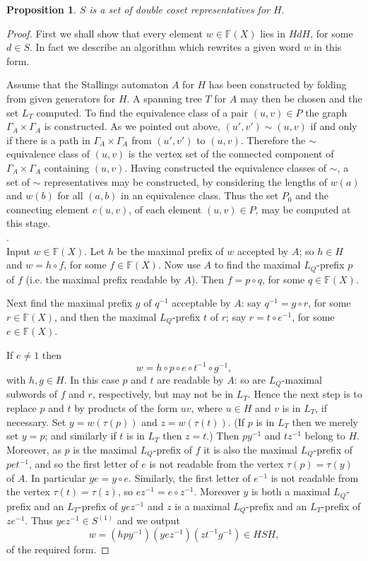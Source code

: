 \documentclass[a4paper,12pt]{article}
\newcommand{\G}{\Gamma }
\renewcommand{\t}{\tau }
\newtheorem{proposition}[theorem]{Proposition}
\numberwithin{equation}{section}
\numberwithin{figure}{section}
\newcommand{\FF}{\ensuremath{\mathbb{F}}}
\begin{document}
\begin{proposition}\label{prop:dcreps}
$S$ is a set of double coset representatives for $H$.
\end{proposition}
\begin{proof}
First we shall show that every element $w\in \FF(X)$ lies in $HdH$,
for some $d\in S$. In fact we describe an algorithm which
rewrites a given word $w$ in this form.

Assume that the Stallings automaton $A$ for $H$ has been constructed by folding from
given generators for $H$. A spanning tree $T$
for $A$ may then be chosen and the
set $L_T$ computed.
To find the equivalence class of a pair $(u,v)\in P$ the
graph $\G_A\times \G_A$ is constructed. As we pointed out above, $(u',v')\sim
(u,v)$ if and only if there is a path in $\G_A\times \G_A$ from $(u',v')$
to $(u,v)$. Therefore the $\sim$ equivalence class of $(u,v)$ is the
vertex set of the connected component of $\G_A\times \G_A$ containing
$(u,v)$.
Having constructed the equivalence classes of $\sim$,
 a set of $\sim$ representatives may be constructed, by considering the
lengths of $w(a)$ and $w(b)$ for all $(a,b)$ in an equivalence class. Thus the
set $P_0$ and the connecting element $c(u,v)$, of each element
$(u,v)\in P$, may be computed at this stage.   \\

.\\
Input $w\in \FF(X)$.
Let $h$ be the maximal prefix of $w$ accepted by $A$; so $h\in H$ and
$w=h\circ f$, for some $f\in \FF(X)$. Now use $A$ to find the maximal
$L_Q$-prefix $p$
of $f$ (i.e. the maximal prefix readable by $A$). Then
  $f= p\circ q$, for some $q\in \FF(X)$.

Next find the maximal prefix $g$ of $q^{-1}$ acceptable by $A$: say
$q^{-1}=g\circ r$, for some $r\in \FF(X)$, and then the maximal $L_Q$-prefix
$t$ of $r$; say $r=t\circ e^{-1}$, for some $e\in \FF(X)$.

If $e\neq 1$ then
\[w=h\circ p \circ e\circ t^{-1}\circ g^{-1},\]
with $h,g\in H$. In this case $p$ and $t$ are readable by $A$:
so are $L_Q$-maximal subwords of $f$ and $r$, respectively, but
may not be in $L_T$. Hence the next step is to replace $p$ and $t$ by
products of the form $uv$, where $u\in H$ and  $v$ is in $L_T$,
 if necessary.
Set $y=w(\t(p))$ and  $z=w(\t(t))$. (If $p$ is in $L_T$ then we
merely set $y=p$; and similarly if $t$ is in $L_T$ then $z=t$.)
Then $py^{-1}$ and $tz^{-1}$ belong to $H$. Moreover, as $p$
is the maximal $L_Q$-prefix of $f$ it is also the maximal
$L_Q$-prefix of $pet^{-1}$,  and so
  the
first letter of $e$ is not readable from the vertex $\t(p)=\t(y)$
of $A$. In
particular $ye=y\circ e$. Similarly, the first letter of $e^{-1}$
is not readable from the vertex $\t(t)=\t(z)$, so $ez^{-1}=e\circ
z^{-1}$. Moreover $y$ is both a maximal $L_Q$-prefix  and an
$L_T$-prefix of $yez^{-1}$ and $z$ is a maximal $L_Q$-prefix  and
an $L_T$-prefix of $ze^{-1}$. Thus $yez^{-1}\in S^{(1)}$ and we
output
\[w=(h py^{-1}) (yez^{-1})(zt^{-1} g^{-1})\in HSH,\]
of the required form.


\end{proof}
\end{document}

